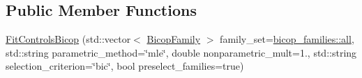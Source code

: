 \subsection*{Public Member Functions}
\begin{DoxyCompactItemize}
\item 
\hyperlink{classvinecopulib_1_1_fit_controls_bicop_a544d095b0ef0a99e08b8ca60a5753fbe}{Fit\+Controls\+Bicop} (std\+::vector$<$ \hyperlink{namespacevinecopulib_a42e95cc06d33896199caab0c11ad44f3}{Bicop\+Family} $>$ family\+\_\+set=\hyperlink{namespacevinecopulib_1_1bicop__families_a5214a513f41ec23b74782aab96ea6774}{bicop\+\_\+families\+::all}, std\+::string parametric\+\_\+method=\char`\"{}mle\char`\"{}, double nonparametric\+\_\+mult=1., std\+::string selection\+\_\+criterion=\char`\"{}bic\char`\"{}, bool preselect\+\_\+families=true)
\end{DoxyCompactItemize}
{\bf }\par
